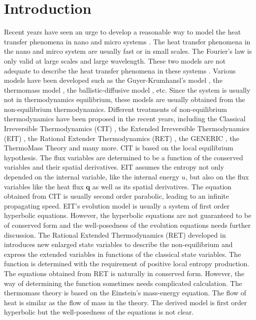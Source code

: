 \documentclass[a4paper]{article}
\begin{document}
\section{Introduction}
Recent years have seen an urge to develop a reasonable way to model the heat transfer phenomena in nano and micro systems \cite{chen2005nanoscale,tzou1996macro,wang2007heat,ding2006heat}. The heat transfer phenomena in the nano and mirco system are usually fast or in small scales. The Fourier's law is only valid at large scales and large wavelength. These two models are not adequate to describe the heat transfer phenomena in these systems \cite{chen2005nanoscale,Jou1996extended}. Various models have been developed such as the Guyer-Krumhansl's model \cite{guyer1966solution}, the thermomass model \cite{tzou2010nonlocal}, the ballistic-diffusive model \cite{chen2001ballistic,chen2002ballistic}, etc. Since the system is usually not in thermodynamics equilibrium, these models are usually obtained from the non-equilibrium thermodynamics. Different treatments of non-equilibrium thermodynamics have been proposed in the recent years, including the Classical Irreversible Thermodynamics (CIT) \cite{lebon2008classical}, the Extended Irreversible Thermodynamics (EIT) \cite{Jou1996extended}, the Rational Extender Thermodynamics (RET) \cite{muller1998rational}, the GENERIC \cite{hans2005beyond}, the ThermoMass Theory \cite{zeng2006motion,dong2011generalized} and many more. CIT is based on the local equilibrium hypothesis. The flux variables are determined to be a function of the conserved variables and their spatial derivatives. EIT assumes the entropy not only depended on the internal variable, like the internal energy $u$, but also on the flux variables like the heat flux $\mathbf{q}$ as well as its spatial derivatives. The equation obtained from CIT is usually second order parabolic, leading to an infinite propagating speed. EIT's evolution model is usually a system of first order hyperbolic equations. However, the hyperbolic equations are not guaranteed to be of conserved form and the well-posedness of the evolution equations needs further discussion\cite{Jou1996extended}. The Rational Extended Thermodynamics (RET) developed in \cite{liu2002rational,muller1998formal,Jou1996extended} introduces new enlarged state variables to describe the non-equilibrium and express the extended variables in functions of the classical state variables. The function is determined with the requirement of positive local entropy production. The equations obtained from RET is naturally in conserved form. However, the way of determining the function sometimes needs complicated calculation. The thermomass theory is based on the Einstein's mass-energy equation. The flow of heat is similar as the flow of mass in the theory. The derived model is first order hyperbolic but the well-posedness of the equations is not clear.%
\end{document}
